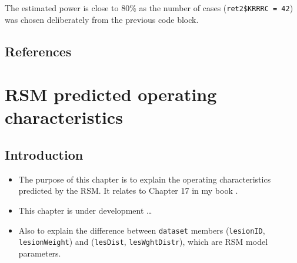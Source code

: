 \documentclass[
]{book}
\newenvironment{Shaded}{\begin{snugshade}}{\end{snugshade}}
\newcommand{\CharTok}[1]{\textcolor[rgb]{0.31,0.60,0.02}{#1}}
\newcommand{\CommentTok}[1]{\textcolor[rgb]{0.56,0.35,0.01}{\textit{#1}}}
\newcommand{\DataTypeTok}[1]{\textcolor[rgb]{0.13,0.29,0.53}{#1}}
\newcommand{\DecValTok}[1]{\textcolor[rgb]{0.00,0.00,0.81}{#1}}
\newcommand{\KeywordTok}[1]{\textcolor[rgb]{0.13,0.29,0.53}{\textbf{#1}}}
\newcommand{\NormalTok}[1]{#1}
\newcommand{\OperatorTok}[1]{\textcolor[rgb]{0.81,0.36,0.00}{\textbf{#1}}}
\newcommand{\OtherTok}[1]{\textcolor[rgb]{0.56,0.35,0.01}{#1}}
\newcommand{\StringTok}[1]{\textcolor[rgb]{0.31,0.60,0.02}{#1}}
\providecommand{\tightlist}{%
  \setlength{\itemsep}{0pt}\setlength{\parskip}{0pt}}
\begin{document}
\begin{Shaded}
\end{Shaded}

The estimated power is close to 80\% as the number of cases (\texttt{ret2\$KRRRC\ =\ 42}) was chosen deliberately from the previous code block.

\hypertarget{references-9}{%
\section{References}\label{references-9}}

\hypertarget{RsmOpCh}{%
\chapter{RSM predicted operating characteristics}\label{RsmOpCh}}

\hypertarget{introduction-14}{%
\section{Introduction}\label{introduction-14}}

\begin{itemize}
\tightlist
\item
  The purpose of this chapter is to explain the operating characteristics predicted by the RSM. It relates to Chapter 17 in my book \citep{RN2680}.
\item
  This chapter is under development \ldots{}
\item
  Also to explain the difference between \texttt{dataset} members (\texttt{lesionID}, \texttt{lesionWeight}) and (\texttt{lesDist}, \texttt{lesWghtDistr}), which are RSM model parameters.
\end{itemize}
\end{document}
